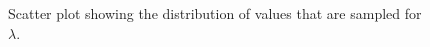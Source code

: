 \documentclass{article}
\begin{document}
\begin{figure}[H]
	\centerline{
		}
	\caption{Scatter plot showing the distribution of values that are sampled for $\lambda$.}
	\label{1.fig:r3_scat_L}
\end{figure}
\end{document}
